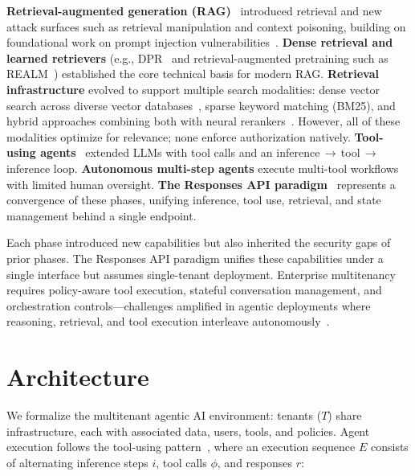 \documentclass[sigconf]{acmart}
\begin{document}
\textbf{Retrieval-augmented generation (RAG)}~\cite{lewis2020rag} introduced retrieval and new attack surfaces such as retrieval manipulation and context poisoning, building on foundational work on prompt injection vulnerabilities~\cite{willison2022prompt}.
\textbf{Dense retrieval and learned retrievers} (e.g., DPR~\cite{karpukhin2020dpr} and retrieval-augmented pretraining such as REALM~\cite{guu2020realm}) established the core technical basis for modern RAG.
\textbf{Retrieval infrastructure} evolved to support multiple search modalities: dense vector search across diverse vector databases~\cite{johnson2017faiss}, sparse keyword matching (BM25), and hybrid approaches combining both with neural rerankers~\cite{blendedrag2024}. However, all of these modalities optimize for relevance; none enforce authorization natively.
\textbf{Tool-using agents}~\cite{yao2023react,schick2023toolformer,karpas2022mrkl} extended LLMs with tool calls and an inference\,$\rightarrow$\,tool\,$\rightarrow$\,inference loop.
\textbf{Autonomous multi-step agents} execute multi-tool workflows with limited human oversight.
\textbf{The Responses API paradigm}~\cite{openaiResponsesAPI,openresponses} represents a convergence of these phases, unifying inference, tool use, retrieval, and state management behind a single endpoint.

Each phase introduced new capabilities but also inherited the security gaps of prior phases. The Responses API paradigm unifies these capabilities under a single interface but assumes single-tenant deployment. Enterprise multitenancy requires policy-aware tool execution, stateful conversation management, and orchestration controls---challenges amplified in agentic deployments where reasoning, retrieval, and tool execution interleave autonomously~\cite{sculley2015hiddentechnicaldebt,amershi2019se4ml}.


\section{Architecture}
\label{sec:architecture}

We formalize the multitenant agentic AI environment: tenants ($T$) share infrastructure, each with associated data, users, tools, and policies. Agent execution follows the tool-using pattern~\cite{yao2023react,karpas2022mrkl}, where an execution sequence $E$ consists of alternating inference steps $i$, tool calls $\phi$, and responses $r$:
\end{document}

